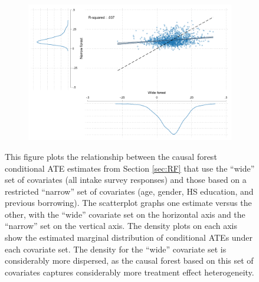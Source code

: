 \documentclass[oneside,11pt]{article}
\begin{document}
\begin{figure}[H]
    \caption{Conditional ATEs from ``wide'' and ``narrow'' covariate sets}
    \label{wide_narrow_forests}
    \begin{center}
    \begin{subfigure}{0.75\textwidth}
        \centering
        \includegraphics[width=\textwidth]{Figuras/scatter_hist_wide_narrow.pdf}
    \end{subfigure}
    \end{center}
      \scriptsize  This figure plots the relationship between the causal forest conditional ATE estimates from Section \ref{sec:RF} that use the ``wide'' set of covariates (all intake survey responses) and those based on a restricted ``narrow'' set of covariates (age, gender, HS education, and previous borrowing). The scatterplot graphs one estimate versus the other, with the ``wide'' covariate set on the horizontal axis and the ``narrow'' set on the vertical axis. The density plots on each axis show the estimated marginal distribution of conditional ATEs under each covariate set. The density for the ``wide'' covariate set is considerably more dispersed, as the causal forest based on this set of covariates captures considerably more treatment effect heterogeneity.

\end{figure}
\end{document}
